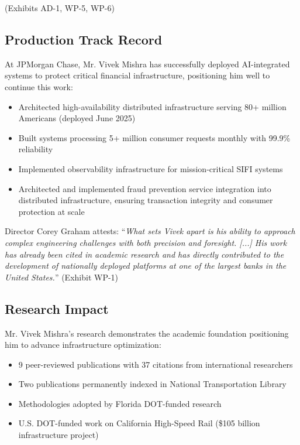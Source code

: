 \documentclass[11pt]{article}
\newcommand{\say}[1]{``#1''}
\newcommand{\dr}{Mr. Vivek Mishra }
\newcommand{\drs}{Mr. Vivek Mishra's }
\newcommand{\qu}[1]{\say{\emph{#1}}}
\begin{document}
(Exhibits AD-1, WP-5, WP-6)

\subsection{Production Track Record}

At JPMorgan Chase, \dr has successfully deployed AI-integrated systems to protect critical financial infrastructure, positioning him well to continue this work:

\begin{itemize}
    \item Architected high-availability distributed infrastructure serving 80+ million Americans (deployed June 2025)
    \item Built systems processing 5+ million consumer requests monthly with 99.9\% reliability
    \item Implemented observability infrastructure for mission-critical SIFI systems
    \item Architected and implemented fraud prevention service integration into distributed infrastructure, ensuring transaction integrity and consumer protection at scale
\end{itemize}

Director Corey Graham attests: \qu{What sets Vivek apart is his ability to approach complex engineering challenges with both precision and foresight. [...] His work has already been cited in academic research and has directly contributed to the development of nationally deployed platforms at one of the largest banks in the United States.} (Exhibit WP-1)

\subsection{Research Impact}

\drs research demonstrates the academic foundation positioning him to advance infrastructure optimization:

\begin{itemize}
    \item 9 peer-reviewed publications with 37 citations from international researchers
    \item Two publications permanently indexed in National Transportation Library
    \item Methodologies adopted by Florida DOT-funded research
    \item U.S. DOT-funded work on California High-Speed Rail (\$105 billion infrastructure project)
\end{itemize}
\end{document}
